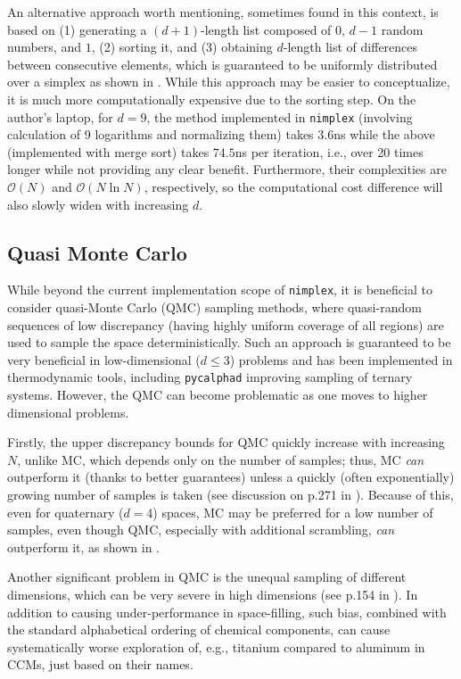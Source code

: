 An alternative approach worth mentioning, sometimes found in this context, is based on (1) generating a $(d+1)$-length list composed of $0$, $d-1$ random numbers, and $1$, (2) sorting it, and (3) obtaining $d$-length list of differences between consecutive elements, which is guaranteed to be uniformly distributed over a simplex as shown in \cite{Rubin1981TheBootstrap}. While this approach may be easier to conceptualize, it is much more computationally expensive due to the sorting step. On the author's laptop, for $d=9$, the method implemented in \texttt{nimplex} (involving calculation of 9 logarithms and normalizing them) takes $3.6$ns while the above (implemented with merge sort) takes $74.5$ns per iteration, i.e., over 20 times longer while not providing any clear benefit. Furthermore, their complexities are $\mathcal{O}(N)$ and $\mathcal{O}(N \ln N)$, respectively, so the computational cost difference will also slowly widen with increasing $d$. 


\subsection{Quasi Monte Carlo} \label{ssec:qmc}
While beyond the current implementation scope of \texttt{nimplex}, it is beneficial to consider quasi-Monte Carlo (QMC) sampling methods, where quasi-random sequences of low discrepancy (having highly uniform coverage of all regions) are used to sample the space deterministically. Such an approach is guaranteed to be very beneficial in low-dimensional ($d\leq3$) problems and has been implemented in thermodynamic tools, including \texttt{pycalphad} \cite{Otis2017Pycalphad:Python, Otis2017AnSystems} improving sampling of ternary systems. However, the QMC can become problematic as one moves to higher dimensional problems. 

Firstly, the upper discrepancy bounds for QMC quickly increase with increasing $N$, unlike MC, which depends only on the number of samples; thus, MC \textit{can} outperform it (thanks to better guarantees) unless a quickly (often exponentially) growing number of samples is taken (see discussion on p.271 in \cite{Asmussen2007StochasticAnalysis}). Because of this, even for quaternary ($d=4$) spaces, MC may be preferred for a low number of samples, even though QMC, especially with additional scrambling, \textit{can} outperform it, as shown in \cite{Otis2017AnSystems}. 

Another significant problem in QMC is the unequal sampling of different dimensions, which can be very severe in high dimensions (see p.154 in \cite{Lemieux2009MonteSampling}). In addition to causing under-performance in space-filling, such bias, combined with the standard alphabetical ordering of chemical components, can cause systematically worse exploration of, e.g., titanium compared to aluminum in CCMs, just based on their names.


